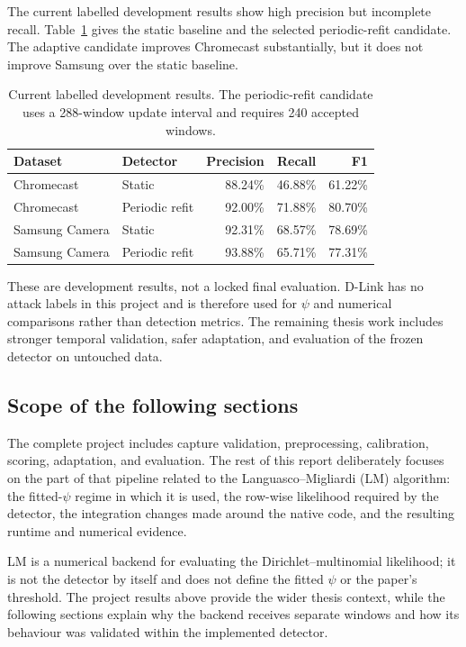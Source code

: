 \documentclass[11pt]{article}
\begin{document}
The current labelled development results show high precision but incomplete
recall. Table~\ref{tab:project-results} gives the static baseline and the
selected periodic-refit candidate. The adaptive candidate improves Chromecast
substantially, but it does not improve Samsung over the static baseline.

\begin{table}[htbp]
\centering
\caption{Current labelled development results. The periodic-refit candidate
uses a 288-window update interval and requires 240 accepted windows.}
\label{tab:project-results}
\begin{tabular}{llrrr}
\toprule
Dataset & Detector & Precision & Recall & F1 \\
\midrule
Chromecast & Static & 88.24\% & 46.88\% & 61.22\% \\
Chromecast & Periodic refit & 92.00\% & 71.88\% & 80.70\% \\
Samsung Camera & Static & 92.31\% & 68.57\% & 78.69\% \\
Samsung Camera & Periodic refit & 93.88\% & 65.71\% & 77.31\% \\
\bottomrule
\end{tabular}
\end{table}

These are development results, not a locked final evaluation. D-Link has no
attack labels in this project and is therefore used for \(\psi\) and numerical
comparisons rather than detection metrics. The remaining thesis
work includes stronger temporal validation, safer adaptation, and evaluation
of the frozen detector on untouched data.

\subsection{Scope of the following sections}

The complete project includes capture validation, preprocessing, calibration,
scoring, adaptation, and evaluation. The rest of this report deliberately
focuses on the part of that pipeline related to the Languasco--Migliardi (LM)
algorithm: the fitted-\(\psi\) regime in which it is used, the row-wise likelihood
required by the detector, the integration changes made around the native code,
and the resulting runtime and numerical evidence.

LM is a numerical backend for evaluating the Dirichlet--multinomial likelihood;
it is not the detector by itself and does not define the fitted \(\psi\) or the
paper's threshold. The project results above provide the wider thesis context,
while the following sections explain why the backend receives separate windows
and how its behaviour was validated within the implemented detector.
\end{document}
